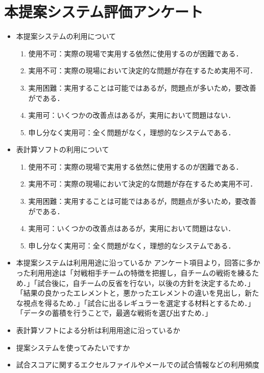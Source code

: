 \documentclass[shuuron]{kuee}
\begin{document}
\chapter{本提案システム評価アンケート}
	\begin{itemize}
		\item 本提案システムの利用について
			\begin{enumerate}
				\item 使用不可：実際の現場で実用する依然に使用するのが困難である．
				\item 実用不可：実際の現場において決定的な問題が存在するため実用不可．
				\item 実用困難：実用することは可能ではあるが，問題点が多いため，要改善がである．
				\item 実用可：いくつかの改善点はあるが，実用において問題はない．
				\item 申し分なく実用可：全く問題がなく，理想的なシステムである．
			\end{enumerate}
		\item 表計算ソフトの利用について
			\begin{enumerate}
				\item 使用不可：実際の現場で実用する依然に使用するのが困難である．
				\item 実用不可：実際の現場において決定的な問題が存在するため実用不可．
				\item 実用困難：実用することは可能ではあるが，問題点が多いため，要改善がである．
				\item 実用可：いくつかの改善点はあるが，実用において問題はない．
				\item 申し分なく実用可：全く問題がなく，理想的なシステムである．
			\end{enumerate}
		\item 本提案システムは利用用途に沿っているか
			アンケート項目より，回答に多かった利用用途は「対戦相手チームの特徴を把握し，自チームの戦術を練るため．」「試合後に，自チームの反省を行ない，以後の方針を決定するため．」「結果の良かったエレメントと，悪かったエレメントの違いを見出し，新たな視点を得るため．」「試合に出るレギュラーを選定する材料とするため．」「データの蓄積を行うことで，最適な戦術を選び出すため．」
		\item 表計算ソフトによる分析は利用用途に沿っているか
		\item 提案システムを使ってみたいですか
		\item 試合スコアに関するエクセルファイルやメールでの試合情報などの利用頻度
	\end{itemize}


\end{document}
